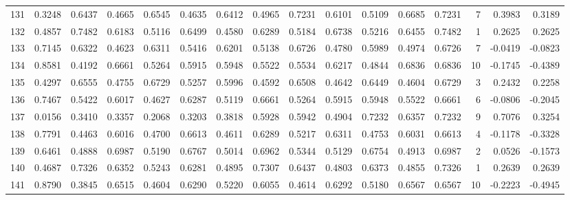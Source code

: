\begin{tabular}{lrrrrrrrrrrrrrrr}
131 &      0.3248 &  0.6437 &  0.4665 &  0.6545 &  0.4635 &  0.6412 &  0.4965 &  0.7231 &  0.6101 &  0.5109 &   0.6685 &     0.7231 &      7 &                    0.3983 &                     0.3189 \\
132 &      0.4857 &  0.7482 &  0.6183 &  0.5116 &  0.6499 &  0.4580 &  0.6289 &  0.5184 &  0.6738 &  0.5216 &   0.6455 &     0.7482 &      1 &                    0.2625 &                     0.2625 \\
133 &      0.7145 &  0.6322 &  0.4623 &  0.6311 &  0.5416 &  0.6201 &  0.5138 &  0.6726 &  0.4780 &  0.5989 &   0.4974 &     0.6726 &      7 &                   -0.0419 &                    -0.0823 \\
134 &      0.8581 &  0.4192 &  0.6661 &  0.5264 &  0.5915 &  0.5948 &  0.5522 &  0.5534 &  0.6217 &  0.4844 &   0.6836 &     0.6836 &     10 &                   -0.1745 &                    -0.4389 \\
135 &      0.4297 &  0.6555 &  0.4755 &  0.6729 &  0.5257 &  0.5996 &  0.4592 &  0.6508 &  0.4642 &  0.6449 &   0.4604 &     0.6729 &      3 &                    0.2432 &                     0.2258 \\
136 &      0.7467 &  0.5422 &  0.6017 &  0.4627 &  0.6287 &  0.5119 &  0.6661 &  0.5264 &  0.5915 &  0.5948 &   0.5522 &     0.6661 &      6 &                   -0.0806 &                    -0.2045 \\
137 &      0.0156 &  0.3410 &  0.3357 &  0.2068 &  0.3203 &  0.3818 &  0.5928 &  0.5942 &  0.4904 &  0.7232 &   0.6357 &     0.7232 &      9 &                    0.7076 &                     0.3254 \\
138 &      0.7791 &  0.4463 &  0.6016 &  0.4700 &  0.6613 &  0.4611 &  0.6289 &  0.5217 &  0.6311 &  0.4753 &   0.6031 &     0.6613 &      4 &                   -0.1178 &                    -0.3328 \\
139 &      0.6461 &  0.4888 &  0.6987 &  0.5190 &  0.6767 &  0.5014 &  0.6962 &  0.5344 &  0.5129 &  0.6754 &   0.4913 &     0.6987 &      2 &                    0.0526 &                    -0.1573 \\
140 &      0.4687 &  0.7326 &  0.6352 &  0.5243 &  0.6281 &  0.4895 &  0.7307 &  0.6437 &  0.4803 &  0.6373 &   0.4855 &     0.7326 &      1 &                    0.2639 &                     0.2639 \\
141 &      0.8790 &  0.3845 &  0.6515 &  0.4604 &  0.6290 &  0.5220 &  0.6055 &  0.4614 &  0.6292 &  0.5180 &   0.6567 &     0.6567 &     10 &                   -0.2223 &                    -0.4945 \\

\end{tabular}
